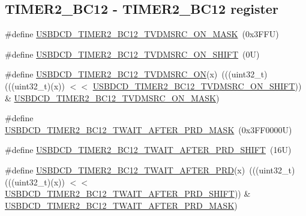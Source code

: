 \subsection*{T\+I\+M\+E\+R2\+\_\+\+B\+C12 -\/ T\+I\+M\+E\+R2\+\_\+\+B\+C12 register}
\begin{DoxyCompactItemize}
\item 
\#define \mbox{\hyperlink{group___u_s_b_d_c_d___register___masks_ga81285a4c1bfeee0d9b9e093d5f3a8ba1}{U\+S\+B\+D\+C\+D\+\_\+\+T\+I\+M\+E\+R2\+\_\+\+B\+C12\+\_\+\+T\+V\+D\+M\+S\+R\+C\+\_\+\+O\+N\+\_\+\+M\+A\+SK}}~(0x3\+F\+F\+U)
\item 
\#define \mbox{\hyperlink{group___u_s_b_d_c_d___register___masks_ga329e3ef8c44895ed8f41db55d2fa1284}{U\+S\+B\+D\+C\+D\+\_\+\+T\+I\+M\+E\+R2\+\_\+\+B\+C12\+\_\+\+T\+V\+D\+M\+S\+R\+C\+\_\+\+O\+N\+\_\+\+S\+H\+I\+FT}}~(0\+U)
\item 
\#define \mbox{\hyperlink{group___u_s_b_d_c_d___register___masks_gaf91acfb039899c33d05ca22fe472cba2}{U\+S\+B\+D\+C\+D\+\_\+\+T\+I\+M\+E\+R2\+\_\+\+B\+C12\+\_\+\+T\+V\+D\+M\+S\+R\+C\+\_\+\+ON}}(x)~(((uint32\+\_\+t)(((uint32\+\_\+t)(x)) $<$$<$ \mbox{\hyperlink{group___u_s_b_d_c_d___register___masks_ga329e3ef8c44895ed8f41db55d2fa1284}{U\+S\+B\+D\+C\+D\+\_\+\+T\+I\+M\+E\+R2\+\_\+\+B\+C12\+\_\+\+T\+V\+D\+M\+S\+R\+C\+\_\+\+O\+N\+\_\+\+S\+H\+I\+FT}})) \& \mbox{\hyperlink{group___u_s_b_d_c_d___register___masks_ga81285a4c1bfeee0d9b9e093d5f3a8ba1}{U\+S\+B\+D\+C\+D\+\_\+\+T\+I\+M\+E\+R2\+\_\+\+B\+C12\+\_\+\+T\+V\+D\+M\+S\+R\+C\+\_\+\+O\+N\+\_\+\+M\+A\+SK}})
\item 
\#define \mbox{\hyperlink{group___u_s_b_d_c_d___register___masks_ga57bc382e906fb13b85747acdef99e068}{U\+S\+B\+D\+C\+D\+\_\+\+T\+I\+M\+E\+R2\+\_\+\+B\+C12\+\_\+\+T\+W\+A\+I\+T\+\_\+\+A\+F\+T\+E\+R\+\_\+\+P\+R\+D\+\_\+\+M\+A\+SK}}~(0x3\+F\+F0000\+U)
\item 
\#define \mbox{\hyperlink{group___u_s_b_d_c_d___register___masks_ga74ba24e1b99aacbe03cfab94267a2d5c}{U\+S\+B\+D\+C\+D\+\_\+\+T\+I\+M\+E\+R2\+\_\+\+B\+C12\+\_\+\+T\+W\+A\+I\+T\+\_\+\+A\+F\+T\+E\+R\+\_\+\+P\+R\+D\+\_\+\+S\+H\+I\+FT}}~(16\+U)
\item 
\#define \mbox{\hyperlink{group___u_s_b_d_c_d___register___masks_ga0303615438e18cd52f1e19a84966b670}{U\+S\+B\+D\+C\+D\+\_\+\+T\+I\+M\+E\+R2\+\_\+\+B\+C12\+\_\+\+T\+W\+A\+I\+T\+\_\+\+A\+F\+T\+E\+R\+\_\+\+P\+RD}}(x)~(((uint32\+\_\+t)(((uint32\+\_\+t)(x)) $<$$<$ \mbox{\hyperlink{group___u_s_b_d_c_d___register___masks_ga74ba24e1b99aacbe03cfab94267a2d5c}{U\+S\+B\+D\+C\+D\+\_\+\+T\+I\+M\+E\+R2\+\_\+\+B\+C12\+\_\+\+T\+W\+A\+I\+T\+\_\+\+A\+F\+T\+E\+R\+\_\+\+P\+R\+D\+\_\+\+S\+H\+I\+FT}})) \& \mbox{\hyperlink{group___u_s_b_d_c_d___register___masks_ga57bc382e906fb13b85747acdef99e068}{U\+S\+B\+D\+C\+D\+\_\+\+T\+I\+M\+E\+R2\+\_\+\+B\+C12\+\_\+\+T\+W\+A\+I\+T\+\_\+\+A\+F\+T\+E\+R\+\_\+\+P\+R\+D\+\_\+\+M\+A\+SK}})
\end{DoxyCompactItemize}


